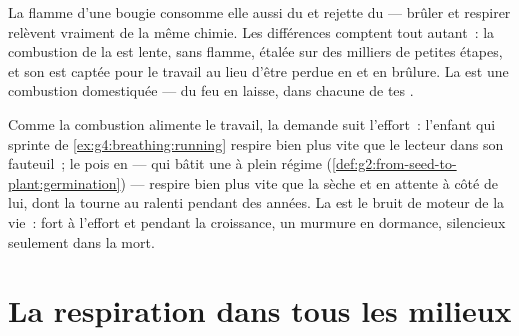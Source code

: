 \begin{example}\label{ex:g7:what-is-respiration:fire}
La flamme d'une bougie consomme elle aussi du  et rejette
du  --- brûler et respirer relèvent vraiment de la
même chimie. Les différences comptent tout autant~: la combustion de
la  est lente, sans flamme, étalée sur des milliers de
petites étapes, et son  est captée pour le travail au lieu
d'être perdue en  et en brûlure. La  est une
combustion domestiquée --- du feu en laisse, dans chacune de tes
.
\end{example}

\begin{example}\label{ex:g7:what-is-respiration:demand}
Comme la combustion alimente le travail, la demande suit l'effort~:
l'enfant qui sprinte de \cref{ex:g4:breathing:running} respire bien
plus vite que le lecteur dans son fauteuil~; le pois en 
--- qui bâtit une  à plein régime
(\cref{def:g2:from-seed-to-plant:germination}) --- respire bien plus
vite que la  sèche et en attente à côté de lui, dont la
 tourne au ralenti pendant des années. La  est
le bruit de moteur de la vie~: fort à l'effort et pendant la
croissance, un murmure en dormance, silencieux seulement dans la
mort.
\end{example}

\section{La respiration dans tous les milieux}

